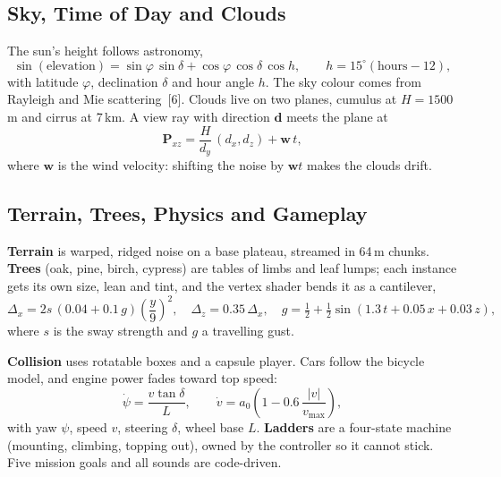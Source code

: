 \documentclass[12pt,a4paper,oneside]{report}
\begin{document}
\subsection{Sky, Time of Day and Clouds}
The sun's height follows astronomy,
\begin{equation}\sin(\text{elevation})=\sin\varphi\,\sin\delta+\cos\varphi\,\cos\delta\,\cos h,\qquad h=15^{\circ}(\text{hours}-12),\end{equation}
with latitude $\varphi$, declination $\delta$ and hour angle $h$. The sky colour comes from Rayleigh and Mie scattering~[6]. Clouds live on two planes, cumulus at $H=1500$\,m and cirrus at 7\,km. A view ray with direction $\mathbf d$ meets the plane at
\begin{equation}\mathbf P_{xz}=\frac{H}{d_y}\,(d_x,d_z)+\mathbf w\,t,\end{equation}
where $\mathbf w$ is the wind velocity: shifting the noise by $\mathbf wt$ makes the clouds drift.



\subsection{Terrain, Trees, Physics and Gameplay}
\textbf{Terrain} is warped, ridged noise on a base plateau, streamed in 64\,m chunks. \textbf{Trees} (oak, pine, birch, cypress) are tables of limbs and leaf lumps; each instance gets its own size, lean and tint, and the vertex shader bends it as a cantilever,
\begin{equation}\Delta_x=2s\,(0.04+0.1\,g)\left(\frac{y}{9}\right)^{2},\quad \Delta_z=0.35\,\Delta_x,\quad g=\tfrac12+\tfrac12\sin(1.3\,t+0.05\,x+0.03\,z),\end{equation}
where $s$ is the sway strength and $g$ a travelling gust.

\textbf{Collision} uses rotatable boxes and a capsule player. Cars follow the bicycle model, and engine power fades toward top speed:
\begin{equation}\dot\psi=\frac{v\tan\delta}{L},\qquad \dot v=a_0\left(1-0.6\,\frac{|v|}{v_{\max}}\right),\end{equation}
with yaw $\psi$, speed $v$, steering $\delta$, wheel base $L$. \textbf{Ladders} are a four-state machine (mounting, climbing, topping out), owned by the controller so it cannot stick. Five mission goals and all sounds are code-driven.




\end{document}
